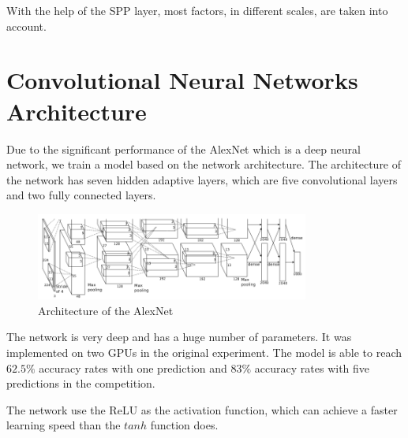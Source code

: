 With the help of the SPP layer, most factors, in different scales, are taken into account.

\section{Convolutional Neural Networks Architecture}

Due to the significant performance of the AlexNet\citep{krizhevsky2012imagenet} which is a deep neural network, we train a model based on the network architecture. The architecture of the network has seven hidden adaptive layers, which are five convolutional layers and two fully connected layers.
\begin{figure}[htb]
    \centering
	\includegraphics[width=0.8\textwidth]{AlexNet.png}
    \caption{Architecture of the AlexNet\citep{krizhevsky2012imagenet}}%
    \label{fig:ImageNetArch}%
\end{figure}
The network is very deep and has a huge number of parameters. It was implemented on two GPUs in the original experiment. The model is able to reach $62.5\%$ accuracy rates with one prediction and $83\%$ accuracy rates with five predictions in the competition.

The network use the ReLU\citep{nair2010rectified} as the activation function, which can achieve a faster learning speed than the $tanh$ function does. 

